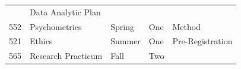 \documentclass[openany]{book}
\begin{document}
\begin{longtable}[]{@{}lllll@{}}
\begin{minipage}[t]{0.10\columnwidth}
\end{minipage} & \begin{minipage}[t]{0.19\columnwidth}\raggedright
Data Analytic Plan\strut
\end{minipage}\tabularnewline
\begin{minipage}[t]{0.03\columnwidth}\raggedright
552\strut
\end{minipage} & \begin{minipage}[t]{0.27\columnwidth}\raggedright
Psychometrics\strut
\end{minipage} & \begin{minipage}[t]{0.26\columnwidth}\raggedright
Spring\strut
\end{minipage} & \begin{minipage}[t]{0.10\columnwidth}\raggedright
One\strut
\end{minipage} & \begin{minipage}[t]{0.19\columnwidth}\raggedright
Method\strut
\end{minipage}\tabularnewline
\begin{minipage}[t]{0.03\columnwidth}\raggedright
521\strut
\end{minipage} & \begin{minipage}[t]{0.27\columnwidth}\raggedright
Ethics\strut
\end{minipage} & \begin{minipage}[t]{0.26\columnwidth}\raggedright
Summer\strut
\end{minipage} & \begin{minipage}[t]{0.10\columnwidth}\raggedright
One\strut
\end{minipage} & \begin{minipage}[t]{0.19\columnwidth}\raggedright
Pre-Registration\strut
\end{minipage}\tabularnewline
\begin{minipage}[t]{0.03\columnwidth}\raggedright
565\strut
\end{minipage} & \begin{minipage}[t]{0.27\columnwidth}\raggedright
Research Practicum\strut
\end{minipage} & \begin{minipage}[t]{0.26\columnwidth}\raggedright
Fall\strut
\end{minipage} & \begin{minipage}[t]{0.10\columnwidth}\raggedright
Two\strut
\end{minipage} & \begin{minipage}[t]{0.19\columnwidth}\raggedright

\end{minipage}
\end{longtable}
\end{document}
